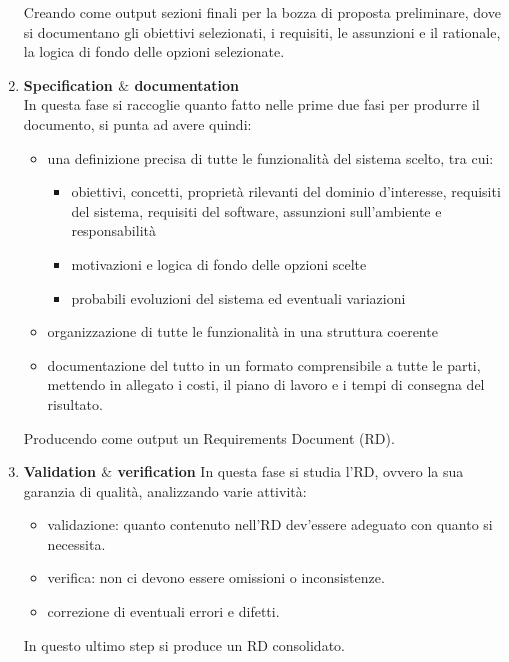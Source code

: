 \begin{enumerate}
\begin{itemize}
        \end{itemize}
        Creando come output sezioni finali per la bozza di proposta preliminare, dove si documentano gli obiettivi selezionati, i requisiti, le assunzioni e il rationale, la logica di fondo delle opzioni selezionate.
    \item \textbf{Specification $\&$ documentation} \\In questa fase si raccoglie quanto fatto nelle prime due fasi per            produrre il documento, si punta ad avere quindi:
        \begin{itemize}
            \item una definizione precisa di tutte le funzionalità del sistema scelto, tra cui:
                \begin{itemize}
                    \item obiettivi, concetti, proprietà rilevanti del dominio d’interesse, requisiti del sistema, requisiti del software, assunzioni sull’ambiente e responsabilità
                    \item motivazioni e logica di fondo delle opzioni scelte
                    \item probabili evoluzioni del sistema ed eventuali variazioni
                \end{itemize}
            \item organizzazione di tutte le funzionalità in una struttura coerente
            \item documentazione del tutto in un formato comprensibile a tutte le parti, mettendo in allegato i costi, il piano di lavoro e i tempi di consegna del risultato.
        \end{itemize}
        Producendo come output un Requirements Document (RD).
    \item \textbf{Validation $\&$ verification}
        In questa fase si studia l’RD, ovvero la sua garanzia di qualità, analizzando varie attività:
        \begin{itemize}
            \item validazione: quanto contenuto nell’RD dev’essere adeguato con quanto si necessita.
            \item verifica: non ci devono essere omissioni o inconsistenze.
            \item correzione di eventuali errori e difetti.
        \end{itemize}
        In questo ultimo step si produce un RD consolidato.
\end{enumerate}
